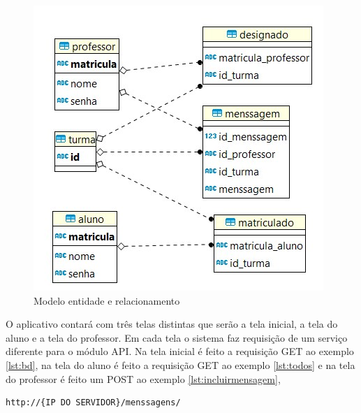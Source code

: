 \begin{figure}[H]
\centering
\includegraphics[scale=0.8]{figuras/entidaderelacionamentomobile}
\caption{Modelo entidade e relacionamento}
\label{fig:entidaderelacionamentomobile}
\end{figure}

O aplicativo contará com três telas distintas que serão a tela inicial, a tela do aluno e a tela do professor. Em cada tela o sistema faz requisição de um serviço diferente para o módulo API. Na tela inicial é feito a requisição GET ao exemplo \ref{lst:bd}, na tela do aluno é feito a requisição GET ao exemplo \ref{lst:todos} e na tela do professor é feito um POST ao exemplo \ref{lst:incluirmensagem},

\begin{lstlisting}[caption={Incluir novas mensagens},label={lst:incluirmensagem}]
	http://{IP DO SERVIDOR}/menssagens/
\end{lstlisting}

